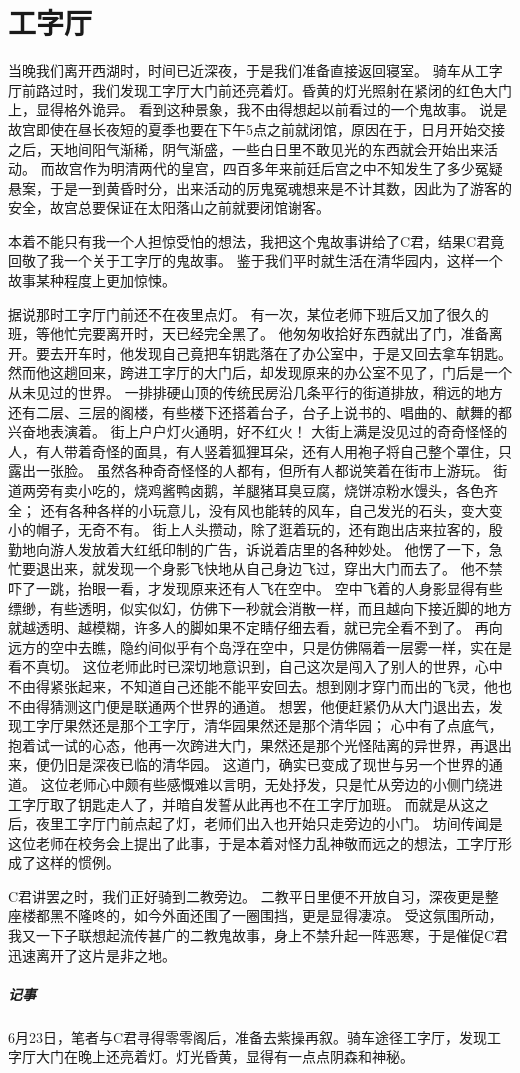 \chapter{工字厅}

当晚我们离开西湖时，时间已近深夜，于是我们准备直接返回寝室。
骑车从工字厅前路过时，我们发现工字厅大门前还亮着灯。昏黄的灯光照射在紧闭的红色大门上，显得格外诡异。
看到这种景象，我不由得想起以前看过的一个鬼故事。
说是故宫即使在昼长夜短的夏季也要在下午5点之前就闭馆，原因在于，日月开始交接之后，天地间阳气渐稀，阴气渐盛，一些白日里不敢见光的东西就会开始出来活动。
而故宫作为明清两代的皇宫，四百多年来前廷后宫之中不知发生了多少冤疑悬案，于是一到黄昏时分，出来活动的厉鬼冤魂想来是不计其数，因此为了游客的安全，故宫总要保证在太阳落山之前就要闭馆谢客。

本着不能只有我一个人担惊受怕的想法，我把这个鬼故事讲给了C君，结果C君竟回敬了我一个关于工字厅的鬼故事。
鉴于我们平时就生活在清华园内，这样一个故事某种程度上更加惊悚。

据说那时工字厅门前还不在夜里点灯。
有一次，某位老师下班后又加了很久的班，等他忙完要离开时，天已经完全黑了。
他匆匆收拾好东西就出了门，准备离开。要去开车时，他发现自己竟把车钥匙落在了办公室中，于是又回去拿车钥匙。
然而他这趟回来，跨进工字厅的大门后，却发现原来的办公室不见了，门后是一个从未见过的世界。
一排排硬山顶的传统民房沿几条平行的街道排放，稍远的地方还有二层、三层的阁楼，有些楼下还搭着台子，台子上说书的、唱曲的、献舞的都兴奋地表演着。
街上户户灯火通明，好不红火！
大街上满是没见过的奇奇怪怪的人，有人带着奇怪的面具，有人竖着狐狸耳朵，还有人用袍子将自己整个罩住，只露出一张脸。
虽然各种奇奇怪怪的人都有，但所有人都说笑着在街市上游玩。
街道两旁有卖小吃的，烧鸡酱鸭卤鹅，羊腿猪耳臭豆腐，烧饼凉粉水馒头，各色齐全；
还有各种各样的小玩意儿，没有风也能转的风车，自己发光的石头，变大变小的帽子，无奇不有。
街上人头攒动，除了逛着玩的，还有跑出店来拉客的，殷勤地向游人发放着大红纸印制的广告，诉说着店里的各种妙处。
他愣了一下，急忙要退出来，就发现一个身影飞快地从自己身边飞过，穿出大门而去了。
他不禁吓了一跳，抬眼一看，才发现原来还有人飞在空中。
空中飞着的人身影显得有些缥缈，有些透明，似实似幻，仿佛下一秒就会消散一样，而且越向下接近脚的地方就越透明、越模糊，许多人的脚如果不定睛仔细去看，就已完全看不到了。
再向远方的空中去瞧，隐约间似乎有个岛浮在空中，只是仿佛隔着一层雾一样，实在是看不真切。
这位老师此时已深切地意识到，自己这次是闯入了别人的世界，心中不由得紧张起来，不知道自己还能不能平安回去。想到刚才穿门而出的飞灵，他也不由得猜测这门便是联通两个世界的通道。
想罢，他便赶紧仍从大门退出去，发现工字厅果然还是那个工字厅，清华园果然还是那个清华园；
心中有了点底气，抱着试一试的心态，他再一次跨进大门，果然还是那个光怪陆离的异世界，再退出来，便仍旧是深夜已临的清华园。
这道门，确实已变成了现世与另一个世界的通道。
这位老师心中颇有些感慨难以言明，无处抒发，只是忙从旁边的小侧门绕进工字厅取了钥匙走人了，并暗自发誓从此再也不在工字厅加班。
而就是从这之后，夜里工字厅门前点起了灯，老师们出入也开始只走旁边的小门。
坊间传闻是这位老师在校务会上提出了此事，于是本着对怪力乱神敬而远之的想法，工字厅形成了这样的惯例。

C君讲罢之时，我们正好骑到二教旁边。
二教平日里便不开放自习，深夜更是整座楼都黑不隆咚的，如今外面还围了一圈围挡，更是显得凄凉。
受这氛围所动，我又一下子联想起流传甚广的二教鬼故事，身上不禁升起一阵恶寒，于是催促C君迅速离开了这片是非之地。

\vfill

\paragraph{记事}
6月23日，笔者与C君寻得零零阁后，准备去紫操再叙。骑车途径工字厅，发现工字厅大门在晚上还亮着灯。灯光昏黄，显得有一点点阴森和神秘。
